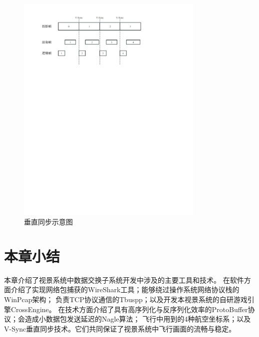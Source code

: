 \begin{figure}[h!]
    \begin{center}
        \includegraphics[width=0.8\textwidth]{pictures/vsync.pdf}
        \caption{垂直同步示意图}
        \label{vsync}
    \end{center}
\end{figure}
\section{本章小结}
本章介绍了视景系统中数据交换子系统开发中涉及的主要工具和技术。
在软件方面介绍了实现网络包捕获的WireShark工具；能够绕过操作系统网络协议栈的WinPcap架构；
负责TCP协议通信的Tbuspp；以及开发本视景系统的自研游戏引擎CrossEngine。
在技术方面介绍了具有高序列化与反序列化效率的ProtoBuffer协议；会造成小数据包发送延迟的Nagle算法；
飞行中用到的4种航空坐标系；以及V-Sync垂直同步技术。它们共同保证了视景系统中飞行画面的流畅与稳定。
